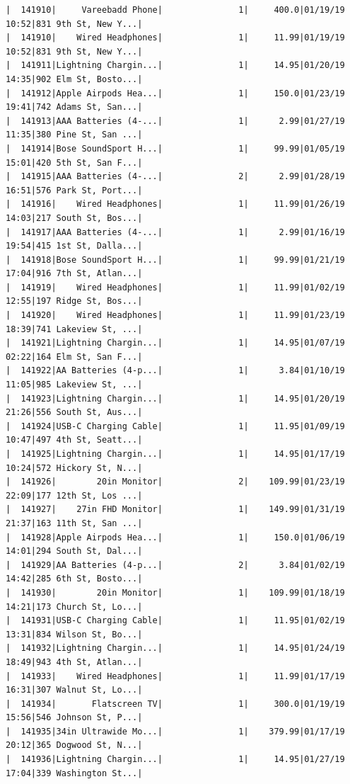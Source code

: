 \documentclass[
  letterpaper,
  DIV=11,
  numbers=noendperiod]{scrartcl}
\begin{document}
\begin{verbatim}
|  141910|     Vareebadd Phone|               1|     400.0|01/19/19 10:52|831 9th St, New Y...|
|  141910|    Wired Headphones|               1|     11.99|01/19/19 10:52|831 9th St, New Y...|
|  141911|Lightning Chargin...|               1|     14.95|01/20/19 14:35|902 Elm St, Bosto...|
|  141912|Apple Airpods Hea...|               1|     150.0|01/23/19 19:41|742 Adams St, San...|
|  141913|AAA Batteries (4-...|               1|      2.99|01/27/19 11:35|380 Pine St, San ...|
|  141914|Bose SoundSport H...|               1|     99.99|01/05/19 15:01|420 5th St, San F...|
|  141915|AAA Batteries (4-...|               2|      2.99|01/28/19 16:51|576 Park St, Port...|
|  141916|    Wired Headphones|               1|     11.99|01/26/19 14:03|217 South St, Bos...|
|  141917|AAA Batteries (4-...|               1|      2.99|01/16/19 19:54|415 1st St, Dalla...|
|  141918|Bose SoundSport H...|               1|     99.99|01/21/19 17:04|916 7th St, Atlan...|
|  141919|    Wired Headphones|               1|     11.99|01/02/19 12:55|197 Ridge St, Bos...|
|  141920|    Wired Headphones|               1|     11.99|01/23/19 18:39|741 Lakeview St, ...|
|  141921|Lightning Chargin...|               1|     14.95|01/07/19 02:22|164 Elm St, San F...|
|  141922|AA Batteries (4-p...|               1|      3.84|01/10/19 11:05|985 Lakeview St, ...|
|  141923|Lightning Chargin...|               1|     14.95|01/20/19 21:26|556 South St, Aus...|
|  141924|USB-C Charging Cable|               1|     11.95|01/09/19 10:47|497 4th St, Seatt...|
|  141925|Lightning Chargin...|               1|     14.95|01/17/19 10:24|572 Hickory St, N...|
|  141926|        20in Monitor|               2|    109.99|01/23/19 22:09|177 12th St, Los ...|
|  141927|    27in FHD Monitor|               1|    149.99|01/31/19 21:37|163 11th St, San ...|
|  141928|Apple Airpods Hea...|               1|     150.0|01/06/19 14:01|294 South St, Dal...|
|  141929|AA Batteries (4-p...|               2|      3.84|01/02/19 14:42|285 6th St, Bosto...|
|  141930|        20in Monitor|               1|    109.99|01/18/19 14:21|173 Church St, Lo...|
|  141931|USB-C Charging Cable|               1|     11.95|01/02/19 13:31|834 Wilson St, Bo...|
|  141932|Lightning Chargin...|               1|     14.95|01/24/19 18:49|943 4th St, Atlan...|
|  141933|    Wired Headphones|               1|     11.99|01/17/19 16:31|307 Walnut St, Lo...|
|  141934|       Flatscreen TV|               1|     300.0|01/19/19 15:56|546 Johnson St, P...|
|  141935|34in Ultrawide Mo...|               1|    379.99|01/17/19 20:12|365 Dogwood St, N...|
|  141936|Lightning Chargin...|               1|     14.95|01/27/19 17:04|339 Washington St...|

\end{verbatim}
\end{document}
